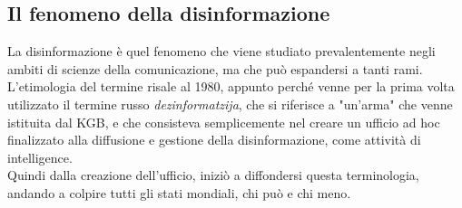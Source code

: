 \documentclass{article}
\begin{document}
\begin{center}
\newpage \section{Il fenomeno della disinformazione}
\end{center}
\begin{justify}
    La disinformazione è quel fenomeno che viene studiato prevalentemente negli ambiti di scienze della comunicazione, ma che può espandersi a tanti rami.
    L'etimologia del termine risale al 1980, appunto perché venne per la prima volta utilizzato il termine russo \textit{dezinformatzija}, che si riferisce a "un'arma" che venne istituita dal KGB, e che consisteva semplicemente nel creare un ufficio ad hoc finalizzato alla diffusione e gestione della disinformazione, come attività di intelligence.\citep{DisWiki}\\
    Quindi dalla creazione dell'ufficio, iniziò a diffondersi questa terminologia, andando a colpire tutti gli stati mondiali, chi può e chi meno.
\end{justify}
\end{document}
